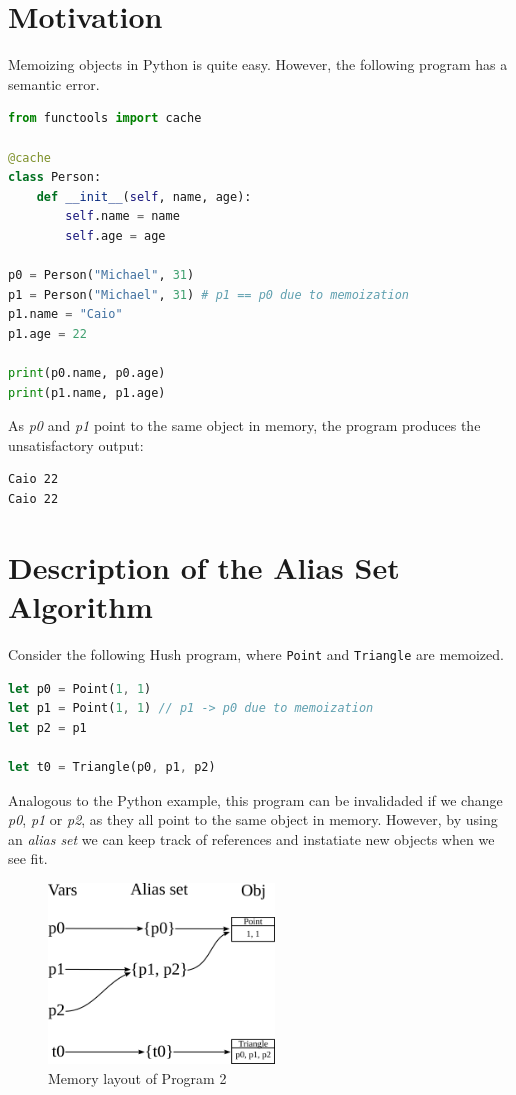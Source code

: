 \documentclass{article}
\begin{document}
\section{Motivation}

Memoizing objects in Python is quite easy. However, the following program has a semantic error.

\begin{lstlisting}[language=Python, style=boxed, tabsize=2]
from functools import cache

@cache
class Person:
    def __init__(self, name, age):
        self.name = name
        self.age = age

p0 = Person("Michael", 31)
p1 = Person("Michael", 31) # p1 == p0 due to memoization
p1.name = "Caio"
p1.age = 22

print(p0.name, p0.age)
print(p1.name, p1.age)
\end{lstlisting}

As \textit{p0} and \textit{p1} point to the same object in memory, the program produces the unsatisfactory output:

\begin{lstlisting}[style=boxed]
Caio 22
Caio 22
\end{lstlisting}

\section{Description of the Alias Set Algorithm}

Consider the following Hush program, where \texttt{Point} and \texttt{Triangle} are memoized.

\begin{lstlisting}[language=Rust, style=boxed, tabsize=2]
let p0 = Point(1, 1)
let p1 = Point(1, 1) // p1 -> p0 due to memoization
let p2 = p1

let t0 = Triangle(p0, p1, p2)
\end{lstlisting}

Analogous to the Python example, this program can be invalidaded if we change \textit{p0}, \textit{p1} or \textit{p2}, as they all point to the same object in memory. However, by using an \textit{alias set} we can keep track of references and instatiate new objects when we see fit.

\begin{figure}[h]
\centering
\includegraphics[width=6cm]{alias-set-diagram.png}
\caption{Memory layout of Program 2}
\end{figure}
\end{document}
